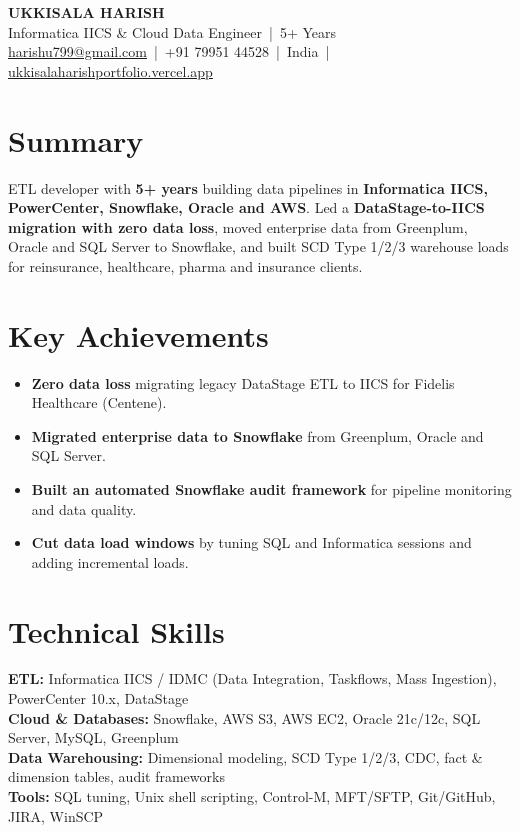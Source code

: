 \documentclass[10pt,a4paper]{article}
\begin{document}
\raggedright

\begin{center}
  {\LARGE\bfseries UKKISALA HARISH}\\[3pt]
  {\large Informatica IICS \& Cloud Data Engineer \,|\, 5+ Years}\\[3pt]
  \href{mailto:harishu799@gmail.com}{harishu799@gmail.com} \,|\,
  +91 79951 44528 \,|\, India \,|\,
  \href{https://ukkisalaharishportfolio.vercel.app/}{ukkisalaharishportfolio.vercel.app}
\end{center}

\section{Summary}
ETL developer with \textbf{5+ years} building data pipelines in \textbf{Informatica IICS, PowerCenter,
Snowflake, Oracle and AWS}. Led a \textbf{DataStage-to-IICS migration with zero data loss}, moved
enterprise data from Greenplum, Oracle and SQL Server to Snowflake, and built SCD Type 1/2/3
warehouse loads for reinsurance, healthcare, pharma and insurance clients.

\section{Key Achievements}
\begin{itemize}
  \item \textbf{Zero data loss} migrating legacy DataStage ETL to IICS for Fidelis Healthcare (Centene).
  \item \textbf{Migrated enterprise data to Snowflake} from Greenplum, Oracle and SQL Server.
  \item \textbf{Built an automated Snowflake audit framework} for pipeline monitoring and data quality.
  \item \textbf{Cut data load windows} by tuning SQL and Informatica sessions and adding incremental loads.
\end{itemize}

\section{Technical Skills}
\textbf{ETL:} Informatica IICS / IDMC (Data Integration, Taskflows, Mass Ingestion), PowerCenter 10.x, DataStage\\
\textbf{Cloud \& Databases:} Snowflake, AWS S3, AWS EC2, Oracle 21c/12c, SQL Server, MySQL, Greenplum\\
\textbf{Data Warehousing:} Dimensional modeling, SCD Type 1/2/3, CDC, fact \& dimension tables, audit frameworks\\
\textbf{Tools:} SQL tuning, Unix shell scripting, Control-M, MFT/SFTP, Git/GitHub, JIRA, WinSCP
\end{document}
